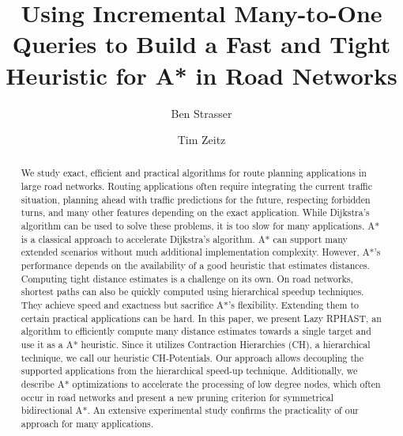 \documentclass[manuscript,review]{acmart}
\begin{document}

\title{Using Incremental Many-to-One Queries to Build a Fast and Tight Heuristic for A* in Road Networks}

\author{Ben Strasser}
\affiliation{}

\author{Tim Zeitz}


\renewcommand{\shortauthors}{B. Strasser and T. Zeitz}


\begin{abstract}
We study exact, efficient and practical algorithms for route planning applications in large road networks.
Routing applications often require integrating the current traffic situation, planning ahead with traffic predictions for the future, respecting forbidden turns, and many other features depending on the exact application.
While Dijkstra's algorithm can be used to solve these problems, it is too slow for many applications.
A* is a classical approach to accelerate Dijkstra's algorithm.
A* can support many extended scenarios without much additional implementation complexity.
However, A*'s performance depends on the availability of a good heuristic that estimates distances.
Computing tight distance estimates is a challenge on its own.
On road networks, shortest paths can also be quickly computed using hierarchical speedup techniques.
They achieve speed and exactness but sacrifice A*'s flexibility.
Extending them to certain practical applications can be hard.
In this paper, we present Lazy RPHAST, an algorithm to efficiently compute many distance estimates towards a single target and use it as a A* heuristic.
Since it utilizes Contraction Hierarchies (CH), a hierarchical technique, we call our heuristic CH-Potentials.
Our approach allows decoupling the supported applications from the hierarchical speed-up technique.
Additionally, we describe A* optimizations to accelerate the processing of low degree nodes, which often occur in road networks and present a new pruning criterion for symmetrical bidirectional A*.
An extensive experimental study confirms the practicality of our approach for many applications.
\end{abstract}
\end{document}
